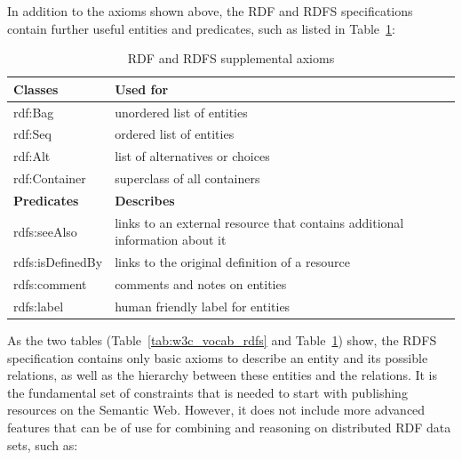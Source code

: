 In addition to the axioms shown above, the \gls{RDF} and \gls{RDFS} specifications contain further useful entities and predicates, such as listed in Table~\ref{tab:w3c_vocab_supplement}: \@

\begin{table}[H]
\centering
\begin{tabular}{p{5cm}p{7cm}}
\hline
\textbf{Classes} & \textbf{Used for} \\
\hline
rdf:Bag & unordered list of entities \\
\hline
rdf:Seq & ordered list of entities \\
\hline
rdf:Alt & list of alternatives or choices \\
\hline
rdf:Container & superclass of all containers \\
\hline
\textbf{Predicates} & \textbf{Describes} \\
\hline
rdfs:seeAlso &	links to an external resource that contains additional information about it \\
\hline
rdfs:isDefinedBy & links to the original definition of a resource \\
\hline
rdfs:comment & comments and notes on entities \\
\hline
rdfs:label & human friendly label for entities \\
\hline
\end{tabular}
\caption[\gls{RDF} and \gls{RDFS} supplemental axioms]{\gls{RDF} and \gls{RDFS} supplemental axioms \citep[pg. 46-49]{antoniou2012semantic}}
\label{tab:w3c_vocab_supplement}
\end{table}

As the two tables (Table~\ref{tab:w3c_vocab_rdfs} and Table~\ref{tab:w3c_vocab_supplement}) show, the \gls{RDFS} specification contains only basic axioms to describe an entity and its possible relations, as well as the hierarchy between these entities and the relations. It is the fundamental set of constraints that is needed to start with publishing resources on the Semantic Web. However, it does not include more advanced features that can be of use for combining and reasoning on distributed \gls{RDF} data sets, such as: \@

